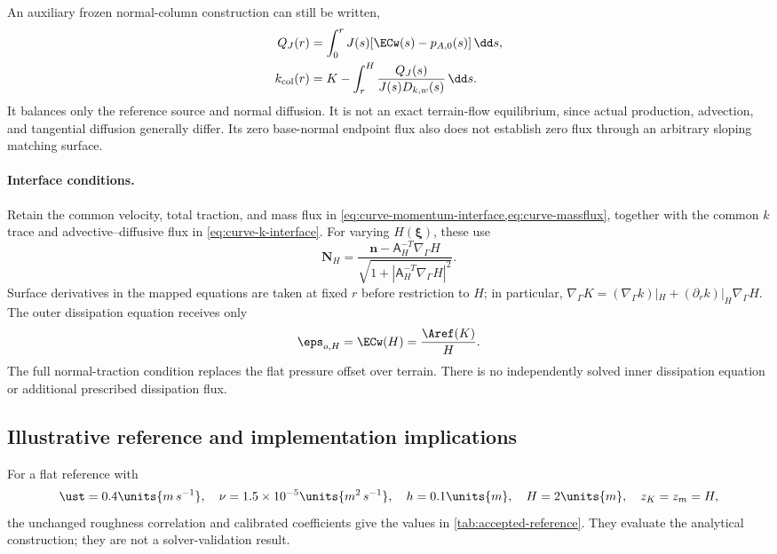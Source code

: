 An auxiliary frozen normal-column construction can still be written,
\begin{equation}
 \begin{aligned}
 Q_J(r)&=\int_0^rJ(s)[\ECw(s)-p_{A,0}(s)]\,\dd s,\\
 k_{\rm col}(r)&=K-\int_r^H
            \frac{Q_J(s)}{J(s)D_{k,w}(s)}\,\dd s.
 \end{aligned}
 \label{eq:accepted-curved-column}
\end{equation}
It balances only the reference source and normal diffusion.
It is not an exact terrain-flow equilibrium, since actual
production, advection, and tangential diffusion generally differ.
Its zero base-normal endpoint flux also does not establish zero
flux through an arbitrary sloping matching surface.

\paragraph{Interface conditions.}
Retain the common velocity, total traction, and mass flux in
\cref{eq:curve-momentum-interface,eq:curve-massflux}, together with
the common $k$ trace and advective--diffusive flux in
\cref{eq:curve-k-interface}. For varying $H(\bm\xi)$, these use
\begin{equation}
 \bm N_H=\frac{\bm n-\mathsf A_H^{-T}\nabla_\Gamma H}
 {\sqrt{1+|\mathsf A_H^{-T}\nabla_\Gamma H|^2}}.
 \label{eq:accepted-curved-interface-normal}
\end{equation}
Surface derivatives in the mapped equations are taken at fixed
$r$ before restriction to $H$; in particular,
$\nabla_\Gamma K=(\nabla_\Gamma k)|_H
+(\partial_rk)|_H\nabla_\Gamma H$.
The outer dissipation equation receives only
\begin{equation}
 \eps_{o,H}=\ECw(H)=\frac{\Aref(K)}{H}.
 \label{eq:accepted-curved-epsilon-trace}
\end{equation}
The full normal-traction condition replaces the flat pressure
offset over terrain. There is no independently solved inner
dissipation equation or additional prescribed dissipation flux.

\subsection{Illustrative reference and implementation implications}
\label{app:accepted-awf-example}

For a flat reference with
\begin{equation}
 \ust=0.4\units{m\,s^{-1}},\quad
 \nu=1.5\times10^{-5}\units{m^2\,s^{-1}},\quad
 h=0.1\units{m},\quad H=2\units{m},\quad z_K=z_m=H,
 \label{eq:accepted-example-inputs}
\end{equation}
the unchanged roughness correlation and calibrated coefficients give
the values in \cref{tab:accepted-reference}. They evaluate the
analytical construction; they are not a solver-validation result.

